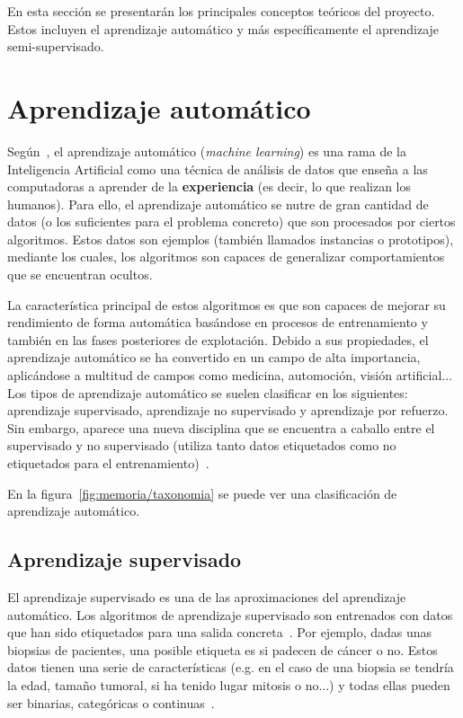 
En esta sección se presentarán los principales conceptos teóricos del proyecto.
Estos incluyen el aprendizaje automático y más específicamente el aprendizaje
semi-supervisado.

\section{Aprendizaje automático}

Según~\cite{intelligent:ml}, el aprendizaje automático (\textit{machine
learning}) es una rama de la Inteligencia Artificial como una técnica de
análisis de datos que enseña a las computadoras a aprender de la
\textbf{experiencia} (es decir, lo que realizan los humanos). Para ello, el
aprendizaje automático se nutre de gran cantidad de datos (o los suficientes
para el problema concreto) que son procesados por ciertos algoritmos. Estos
datos son ejemplos (también llamados instancias o prototipos),~\cite{pascual:ml}
mediante los cuales, los algoritmos son capaces de generalizar comportamientos
que se encuentran ocultos. 

La característica principal de estos algoritmos es que son capaces de mejorar su
rendimiento de forma automática basándose en procesos de entrenamiento y también
en las fases posteriores de explotación. Debido a sus propiedades, el
aprendizaje automático se ha convertido en un campo de alta importancia,
aplicándose a multitud de campos como medicina, automoción, visión
artificial... Los tipos de aprendizaje automático se suelen clasificar en los
siguientes: aprendizaje supervisado, aprendizaje no supervisado y aprendizaje
por refuerzo. Sin embargo, aparece una nueva disciplina que se encuentra a
caballo entre el supervisado y no supervisado (utiliza tanto datos etiquetados
como no etiquetados para el entrenamiento)~\cite{vanEngelen2020}.

En la figura~\ref{fig:memoria/taxonomia} se puede ver una
clasificación de aprendizaje automático.



\subsection{Aprendizaje supervisado}

El aprendizaje supervisado es una de las aproximaciones del aprendizaje
automático. Los algoritmos de aprendizaje supervisado son entrenados con datos
que han sido etiquetados para una salida concreta~\cite{david:sl}. Por ejemplo,
dadas unas biopsias de pacientes, una posible etiqueta es si padecen de cáncer o
no. Estos datos tienen una serie de características (e.g. en el caso de una
biopsia se tendría la edad, tamaño tumoral, si ha tenido lugar mitosis o no...)
y todas ellas pueden ser binarias, categóricas o continuas~\cite{salim:sl}.

